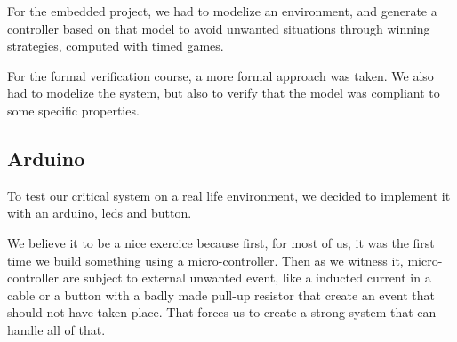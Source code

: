 For the embedded project, we had to modelize an environment, and generate a controller based on that model to avoid unwanted situations through winning strategies, computed with timed games. 

For the formal verification course, a more formal approach was taken. We also had to modelize the system, but also to verify that the model was compliant to some specific properties. 

\subsection{Arduino}

To test our critical system on a real life environment, we decided to implement it with an arduino, leds and button.

We believe it to be a nice exercice because first, for most of us, it was the first time we build something using a micro-controller. Then as we witness it, micro-controller are subject to external unwanted event, like a inducted current in a cable or a button with a badly made pull-up resistor that create an event that should not have taken place. That forces us to create a strong system that can handle all of that.
